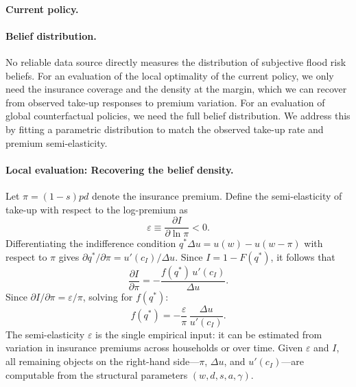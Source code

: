 \documentclass[12pt]{article}
\begin{document}
\paragraph{Current policy.}

\paragraph{Belief distribution.}
No reliable data source directly measures the distribution of subjective flood risk beliefs. For an evaluation of the local optimality of the current policy, we only need the insurance coverage and the density at the margin, which we can recover from observed take-up responses to premium variation. For an evaluation of global counterfactual policies, we need the full belief distribution. We address this by fitting a parametric distribution to match the observed take-up rate and premium semi-elasticity.

\paragraph{Local evaluation: Recovering the belief density.}
Let $\pi=(1-s)pd$ denote the insurance premium. Define the semi-elasticity of take-up with respect to the log-premium as
\[
    \varepsilon \equiv \frac{\partial I}{\partial\ln\pi} < 0.
\]
Differentiating the indifference condition $q^*\Delta u = u(w)-u(w-\pi)$ with respect to $\pi$ gives $\partial q^*/\partial\pi = u'(c_I)/\Delta u$. Since $I=1-F(q^*)$, it follows that
\[
    \frac{\partial I}{\partial\pi} = -\frac{f(q^*)\,u'(c_I)}{\Delta u}.
\]
Since $\partial I/\partial\pi = \varepsilon/\pi$, solving for $f(q^*)$:
\begin{equation}
    f(q^*) = -\frac{\varepsilon}{\pi}\,\frac{\Delta u}{u'(c_I)}. \label{eq:fqstar}
\end{equation}
The semi-elasticity $\varepsilon$ is the single empirical input: it can be estimated from variation in insurance premiums across households or over time. Given $\varepsilon$ and $I$, all remaining objects on the right-hand side---$\pi$, $\Delta u$, and $u'(c_I)$---are computable from the structural parameters $(w,d,s,a,\gamma)$.
\end{document}
